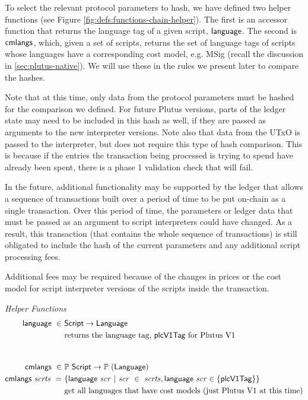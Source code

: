 To select the relevant protocol parameters to hash, we have defined two helper
functions (see Figure \ref{fig:defs:functions-chain-helper}). The first
is an accessor function that returns the language tag of a given script, $\mathsf{language}$.
The second is $\mathsf{cmlangs}$, which, given a set of scripts, returns the set
of language tags of scripts whose languages have a corresponding cost model,
e.g. MSig (recall the discussion in \ref{sec:plutus-native}).
We will use these in the rules we present later to compare the hashes.

Note that at this time, only data from the protocol parameters must be hashed
for the comparison we defined. For future Plutus versions, parts of the ledger
state may need to be included in this hash as well, if they are passed as
arguments to the new interpreter versions. Note also that data from the UTxO
is passed to the interpreter, but does not require this type of hash comparison.
This is because if the entries the transaction being processed is trying to
spend have already been spent, there is a phase 1 validation check that
will fail.

In the future, additional functionality may be supported by the ledger that
allows a sequence of transactions built over a period of time to be put on-chain
as a single transaction. Over this period of time, the parameters or ledger
data that must be passed as an argument to script interpreters could have changed.
As a result, this transaction (that contains the whole sequence of
transactions) is still obligated to include the hash of the current parameters
and any additional script processing fees.

Additional fees may be required because of the changes in prices or the cost model
for script interpreter versions of the scripts inside the transaction.

\begin{figure*}[htb]
  \emph{Helper Functions}
  \begin{align*}
    \fun{language} ~\in~& \Script \to \Language \\
    &\text{returns the language tag, $\mathsf{plcV1Tag}$ for Plutus V1} \\
    \nextdef
    \fun{cmlangs} ~\in~& \powerset{\Script} \to \powerset{(\Language)} \\
    \fun{cmlangs}~ \var{scrts} ~=~ & \{ \fun{language}~\var{scr} ~\vert~
      \var{scr}~\in~ \var{scrts}, \fun{language}~\var{scr} \in \{\mathsf{plcV1Tag} \}  \}\\
    &\text{get all languages that have cost models (just Plutus V1 at this time)} \\
  \end{align*}
  \caption{Languages and Plutus Versions}
  \label{fig:defs:functions-chain-helper}
\end{figure*}